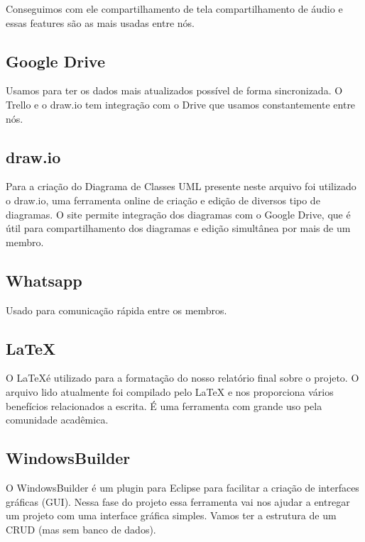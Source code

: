 \documentclass[a4paper,11pt,fleqn]{article}
\begin{document}
Conseguimos com ele compartilhamento de tela compartilhamento de áudio e essas features são as mais usadas entre
  nós.

\subsection{Google Drive}
\label{ss:google-drive}

Usamos para ter os dados mais atualizados possível de forma sincronizada. O Trello e o draw.io tem integração com o Drive que
  usamos constantemente entre nós.

\subsection{draw.io}
\label{ss:draw}

Para a criação do Diagrama de Classes UML presente neste arquivo foi utilizado o draw.io, uma ferramenta online de criação e edição de diversos tipo de diagramas.
 O site permite integração dos diagramas com o Google Drive, que é útil para compartilhamento dos diagramas e edição simultânea por mais de um membro.


\subsection{Whatsapp}
\label{ss:whatsapp}

Usado para comunicação rápida entre os membros.

\subsection{LaTeX}
\label{ss:latex}

O \LaTeX é utilizado para a formatação do nosso relatório final sobre o projeto. O arquivo lido atualmente foi compilado pelo LaTeX e
  nos proporciona vários benefícios relacionados a escrita. É uma ferramenta com grande uso pela comunidade acadêmica.

\subsection{WindowsBuilder}
\label{ss:windows-builder}

O WindowsBuilder é um plugin para Eclipse para facilitar a criação de interfaces gráficas (GUI). Nessa fase do projeto essa
  ferramenta vai nos ajudar a entregar um projeto com uma interface gráfica simples. Vamos ter a estrutura de um CRUD (mas sem banco de dados).
\end{document}
